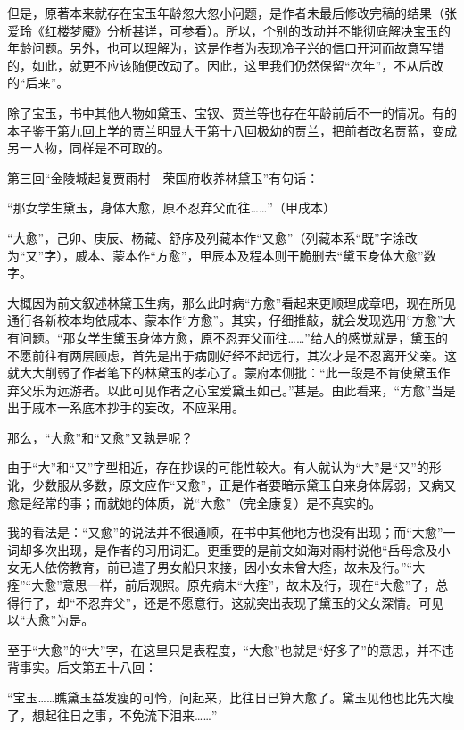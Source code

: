 但是，原著本来就存在宝玉年龄忽大忽小问题，是作者未最后修改完稿的结果（张爱玲《红楼梦魇》分析甚详，可参看）。所以，个别的改动并不能彻底解决宝玉的年龄问题。另外，也可以理解为，这是作者为表现冷子兴的信口开河而故意写错的，如此，就更不应该随便改动了。因此，这里我们仍然保留“次年”，不从后改的“后来”。

除了宝玉，书中其他人物如黛玉、宝钗、贾兰等也存在年龄前后不一的情况。有的本子鉴于第九回上学的贾兰明显大于第十八回极幼的贾兰，把前者改名贾蓝，变成另一人物，同样是不可取的。

{{}}

第三回“金陵城起复贾雨村　荣国府收养林黛玉”有句话：

“那女学生黛玉，身体大愈，原不忍弃父而往\ldots{}\ldots{}”（甲戌本）

“大愈”，己卯、庚辰、杨藏、舒序及列藏本作“又愈”（列藏本系“既”字涂改为“又”字），戚本、蒙本作“方愈”，甲辰本及程本则干脆删去“黛玉身体大愈”数字。

大概因为前文叙述林黛玉生病，那么此时病“方愈”看起来更顺理成章吧，现在所见通行各新校本均依戚本、蒙本作“方愈”。其实，仔细推敲，就会发现选用“方愈”大有问题。“那女学生黛玉身体方愈，原不忍弃父而往\ldots{}\ldots{}”给人的感觉就是，黛玉的不愿前往有两层顾虑，首先是出于病刚好经不起远行，其次才是不忍离开父亲。这就大大削弱了作者笔下的林黛玉的孝心了。蒙府本侧批：“此一段是不肯使黛玉作弃父乐为远游者。以此可见作者之心宝爱黛玉如己。”甚是。由此看来，“方愈”当是出于戚本一系底本抄手的妄改，不应采用。

那么，“大愈”和“又愈”又孰是呢？

由于“大”和“又”字型相近，存在抄误的可能性较大。有人就认为“大”是“又”的形讹，少数服从多数，原文应作“又愈”，正是作者要暗示黛玉自来身体孱弱，又病又愈是经常的事；而就她的体质，说“大愈”（完全康复）是不真实的。

我的看法是：“又愈”的说法并不很通顺，在书中其他地方也没有出现；而“大愈”一词却多次出现，是作者的习用词汇。更重要的是前文如海对雨村说他“岳母念及小女无人依傍教育，前已遣了男女船只来接，因小女未曾大痊，故未及行。”“大痊”“大愈”意思一样，前后观照。原先病未“大痊”，故未及行，现在“大愈”了，总得行了，却“不忍弃父”，还是不愿意行。这就突出表现了黛玉的父女深情。可见以“大愈”为是。

至于“大愈”的“大”字，在这里只是表程度，“大愈”也就是“好多了”的意思，并不违背事实。后文第五十八回：

“宝玉\ldots{}\ldots{}瞧黛玉益发瘦的可怜，问起来，比往日已算大愈了。黛玉见他也比先大瘦了，想起往日之事，不免流下泪来\ldots{}\ldots{}”

